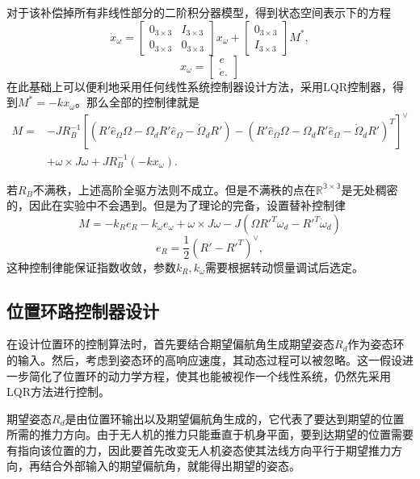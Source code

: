  对于该补偿掉所有非线性部分的二阶积分器模型，得到状态空间表示下的方程
    $$\dot x_\omega=\begin{bmatrix}
        0_{3\times 3} & I_{3\times 3} \\
        0_{3\times 3} & 0_{3\times 3}
    \end{bmatrix} x_\omega+\begin{bmatrix}
        0_{3\times 3} \\ I_{3\times 3}
    \end{bmatrix} M^* ,$$
    $$x_\omega=\begin{bmatrix}
        e \\ \dot e.
    \end{bmatrix}$$
在此基础上可以便利地采用任何线性系统控制器设计方法，采用LQR控制器，得到$M^*=-kx_\omega$。那么全部的控制律就是
   $$ \begin{aligned}
        M=&-J R_B^{-1} [(R' \hat e_\Omega \Omega  -\Omega_d R' \hat e_\Omega -\dot \Omega_d R')-(R' \hat e_\Omega \Omega  -\Omega_d R' \hat e_\Omega -\dot \Omega_d R')^T]^\vee \\
         &+\omega \times J\omega + J R_B^{-1}(-kx_\omega).
    \end{aligned}$$

    若$R_B$不满秩，上述高阶全驱方法则不成立。但是不满秩的点在$\mathbb{R^{3 \times 3}}$是无处稠密的，因此在实验中不会遇到。但是为了理论的完备，设置替补控制律\cite{Lee2010}
    $$M=-k_R e_R-k_\omega e_\omega+\omega \times J \omega -J(\Omega R'^T \omega_d-R'^T \dot \omega_d) $$
    $$ e_R=\frac{1}{2} (R'-R'^T)^\vee ,$$
    这种控制律能保证指数收敛，参数$k_R,k_\omega$需要根据转动惯量调试后选定。
    \subsection*{位置环路控制器设计}
    在设计位置环的控制算法时，首先要结合期望偏航角生成期望姿态$R_d$作为姿态环的输入。然后，考虑到姿态环的高响应速度，其动态过程可以被忽略。这一假设进一步简化了位置环的动力学方程，使其也能被视作一个线性系统，仍然先采用LQR方法进行控制。

    期望姿态$R_d$是由位置环输出以及期望偏航角生成的，它代表了要达到期望的位置所需的推力方向。由于无人机的推力只能垂直于机身平面，要到达期望的位置需要有指向该位置的力，因此要首先改变无人机姿态使其法线方向平行于期望推力方向，再结合外部输入的期望偏航角，就能得出期望的姿态\cite{Lee2010}。

